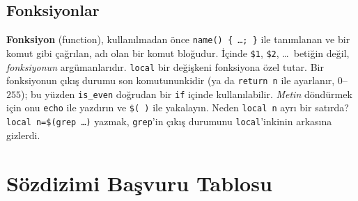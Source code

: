 \documentclass[11pt,a4paper]{article}
\newcommand{\term}[1]{\textbf{\color{mintdeep}#1}}
\newcommand{\cmd}[1]{\texttt{#1}}
\begin{document}
\subsection{Fonksiyonlar}




\term{Fonksiyon} (function), kullanılmadan önce \texttt{name() \{ \ldots; \}} ile tanımlanan ve bir komut gibi çağrılan, adı olan bir komut bloğudur. İçinde \texttt{\$1}, \texttt{\$2}, \ldots\ betiğin değil, \emph{fonksiyonun} argümanlarıdır. \texttt{local} bir değişkeni fonksiyona özel tutar. Bir fonksiyonun çıkış durumu son komutununkidir (ya da \texttt{return n} ile ayarlanır, $0$--$255$); bu yüzden \texttt{is\_even} doğrudan bir \texttt{if} içinde kullanılabilir. \emph{Metin} döndürmek için onu \texttt{echo} ile yazdırın ve \texttt{\$( )} ile yakalayın. Neden \texttt{local n} ayrı bir satırda? \texttt{local n=\$(grep \ldots)} yazmak, \cmd{grep}'in çıkış durumunu \texttt{local}'inkinin arkasına gizlerdi.

\section{Sözdizimi Başvuru Tablosu}
\end{document}
